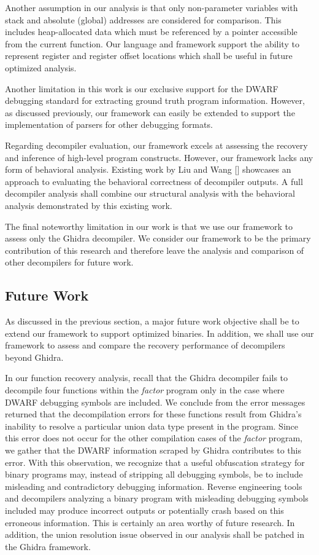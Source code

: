 \documentclass[conference]{IEEEtran}
\begin{document}
Another assumption in our analysis is that only non-parameter variables with stack and absolute (global) addresses are considered for comparison. This includes heap-allocated data which must be referenced by a pointer accessible from the current function. Our language and framework support the ability to represent register and register offset locations which shall be useful in future optimized analysis.

Another limitation in this work is our exclusive support for the DWARF debugging standard for extracting ground truth program information. However, as discussed previously, our framework can easily be extended to support the implementation of parsers for other debugging formats.

Regarding decompiler evaluation, our framework excels at assessing the recovery and inference of high-level program constructs. However, our framework lacks any form of behavioral analysis. Existing work by Liu and Wang [] showcases an approach to evaluating the behavioral correctness of decompiler outputs. A full decompiler analysis shall combine our structural analysis with the behavioral analysis demonstrated by this existing work.

The final noteworthy limitation in our work is that we use our framework to assess only the Ghidra decompiler. We consider our framework to be the primary contribution of this research and therefore leave the analysis and comparison of other decompilers for future work.

\subsection{Future Work}

As discussed in the previous section, a major future work objective shall be to extend our framework to support optimized binaries. In addition, we shall use our framework to assess and compare the recovery performance of decompilers beyond Ghidra.

In our function recovery analysis, recall that the Ghidra decompiler fails to decompile four functions within the \emph{factor} program only in the case where DWARF debugging symbols are included. We conclude from the error messages returned that the decompilation errors for these functions result from Ghidra's inability to resolve a particular union data type present in the program. Since this error does not occur for the other compilation cases of the \emph{factor} program, we gather that the DWARF information scraped by Ghidra contributes to this error. With this observation, we recognize that a useful obfuscation strategy for binary programs may, instead of stripping all debugging symbols, be to include misleading and contradictory debugging information. Reverse engineering tools and decompilers analyzing a binary program with misleading debugging symbols included may produce incorrect outputs or potentially crash based on this erroneous information. This is certainly an area worthy of future research. In addition, the union resolution issue observed in our analysis shall be patched in the Ghidra framework.
\end{document}

